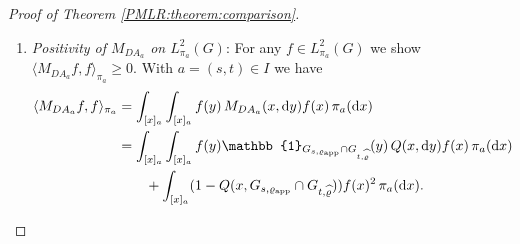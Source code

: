 \documentclass[sn-mathphys-num]{sn-jnl}%
\theoremstyle{thmstyleone}%
\theoremstyle{thmstyletwo}%
\theoremstyle{thmstylethree}%
\newcommand{\rhoapp}{\varrho_{{\rm app}}}
\begin{document}
\begin{appendices}
\begin{proof}[Proof of Theorem \ref{PMLR:theorem:comparison}]
\begin{enumerate}
		For $S_{DA_{{a}}}$ it is obvious due to the relation $S_{DA_{{a}}}(x,A)=\pi_{{a}}(A)$. 
		For proving the reversibility of $M_{DA_{{a}}}$ 
		let $A,B \in \mathcal{B}(G)$ with $A\cap B=\emptyset$.
		We set $c:=1/\pi_0(G_{s, \varrho_{\textmd{app}}}\cap G_{t, \widehat{\varrho}})$ and obtain
		\begin{align*}
			&	\int_{A}^{} M_{DA_{{a}}}(x,B)  \, \pi_{{a}}(\mathrm{d}x) 
			= \int_{A} Q(x, B  \cap  G_{s,\rhoapp}  \cap  G_{t,\widehat{\varrho}})  \, \pi_{{a}}(\mathrm{d} x) \\
			& = c \int_{G} \int_{G} \mathbb{1}_B(y)  \ \mathbb{1}_{G_{s,\rhoapp}\cap G_{t,\widehat{\varrho}}}(y)\ \mathbb{1}_A(x) \mathbb{1}_{G_{s,\varrho_{\textmd{app}}}\cap G_{t,\widehat{\varrho}}}(x)  \,  Q(x,\mathrm{d}y) \, \pi_{0}(\mathrm{d}x) \\
			& = c \int_{G} \int_{G} \mathbb{1}_B(y)  \mathbb{1}_{G_{s, \varrho_{\textmd{app}}}\cap G_{t, \widehat{\varrho}}}(y) \ \mathbb{1}_A(x) \mathbb{1}_{G_{s, \varrho_{\textmd{app}}}\cap G_{t,\widehat{\varrho}}}(x)  \, Q(y,\mathrm{d}x)  \, \pi_{0}(\mathrm{d}y) \\
			& = \int_{B}^{} M_{DA_{{a}}}(y,A)  \, \pi_{{a}}(\mathrm{d}y),
		\end{align*}
		where the last equality follows due to the reversibility of $Q$ w.r.t. $\pi_0$. 
		This implies by standard arguments the claimed $\pi_a$-reversibility of $M_{DA_a}$.
		\item
		\emph{Positivity of $M_{DA_{{a}}}$ on $L^2_{\pi_a}(G)$}: For any $f\in L^2_{\pi_a}(G)$ we show $\langle M_{DA_{{a}}}f, f \rangle_{\pi_{{a}}}\geq 0$.
		With $a=(s,t)\in I$ we have 
		\begin{align*}
			  \langle M_{DA_{{a}}}f, f \rangle_{\pi_{{a}}}
			& = \int_{[x]_{a}} \int_{[x]_{a}} f(y)  \, M_{DA_{{a}}}(x, \mathrm{d}y)  f(x)  \,  \pi_{{a}}(\mathrm{d}x) \\
			& = \int_{[x]_{a}}^{} \int_{[x]_{a}}^{} f(y) \mathbb{1}_{G_{s,\rhoapp}  \cap  G_{t,\widehat{\varrho}}}(y)  \, Q(x,\mathrm{d}y) f(x)  \, \pi_{{a}}(\mathrm{d}x) \\
			& \qquad + \int_{[x]_{a}}^{} (1-Q(x, G_{s,\rhoapp}  \cap  G_{t,\widehat{\varrho}})) f(x)^2 \,  \pi_{{a}}(\mathrm{d}x).

\end{align*}
\end{enumerate}
\end{proof}
\end{appendices}
\end{document}

